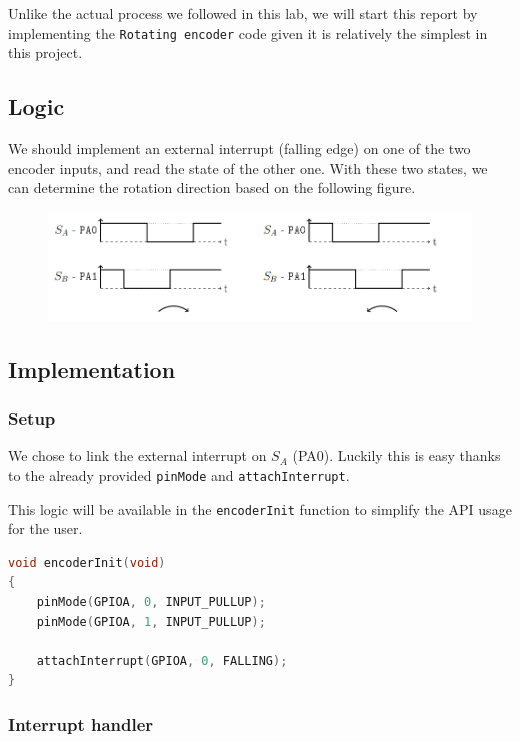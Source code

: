 \documentclass{article}
\begin{document}
Unlike the actual process we followed in this lab, we will start this report by implementing the \verb|Rotating encoder| code given it is relatively the simplest in this project.

\subsection{Logic}

We should implement an external interrupt (falling edge) on one of the two encoder inputs, and read the state of the other one. With these two states, we can determine the rotation direction based on the following figure.

\begin{figure}[H]
    \centering
    \includegraphics[width=12cm]{assets/encoder_logic.png}
\end{figure}

\subsection{Implementation}

\subsubsection{Setup}

We chose to link the external interrupt on $S_A$ (PA0). Luckily this is easy thanks to the already provided \verb|pinMode| and \verb|attachInterrupt|.

This logic will be available in the \verb|encoderInit| function to simplify the API usage for the user.

\begin{lstlisting}[language=C++, caption={encoderInit Implementation}]
void encoderInit(void)
{
    pinMode(GPIOA, 0, INPUT_PULLUP);
    pinMode(GPIOA, 1, INPUT_PULLUP);

    attachInterrupt(GPIOA, 0, FALLING);
}
\end{lstlisting}

\subsubsection{Interrupt handler}
\end{document}
